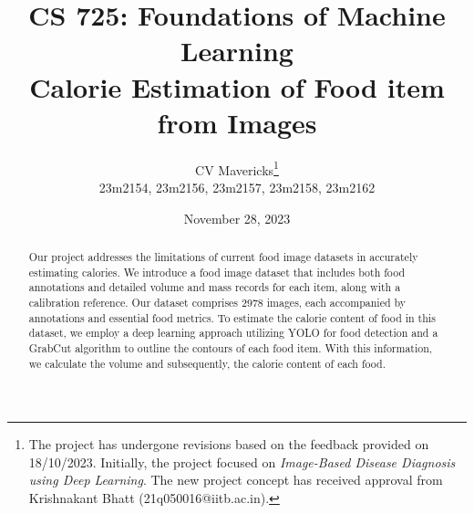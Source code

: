\documentclass[12pt, a4paper, twoside]{article}
\title{\vspace{-0.5in}\textbf{CS 725: Foundations of Machine Learning \\
		Calorie Estimation of Food item from Images}}
\author{CV Mavericks\footnote{The project has undergone revisions based on the feedback provided on 18/10/2023. Initially, the project focused on \emph{Image-Based Disease Diagnosis using Deep Learning}. The new project concept has received approval from Krishnakant Bhatt (21q050016@iitb.ac.in).}\\
	23m2154, 23m2156, 23m2157, 23m2158, 23m2162}
\date{November 28, 2023}
\begin{document}
	\maketitle
	\thispagestyle{fancy}
	
	\begin{abstract}
		Our project addresses the limitations of current food image datasets in accurately estimating calories. We introduce a food image dataset that includes both food annotations and detailed volume and mass records for each item, along with a calibration reference. Our dataset comprises 2978 images, each accompanied by annotations and essential food metrics. To estimate the calorie content of food in this dataset, we employ a deep learning approach utilizing YOLO for food detection and a GrabCut algorithm to outline the contours of each food item. With this information, we calculate the volume and subsequently, the calorie content of each food.
	\end{abstract}
	
\end{document}
